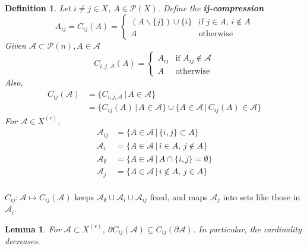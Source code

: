 \documentclass[a4paper]{article}
\newtheorem*{definition}{Definition}
\newtheorem{lemma}[theorem]{Lemma}
\begin{document}
\begin{definition}
	Let $i \neq j \in X$, $A \in \mathcal{P}(X)$. Define the \textbf{ij-compression} $$A_{ij} = C_{ij}(A) = \begin{cases}
	(A\backslash \{j\}) \cup \{i\} & \text{if } j \in A,\, i \not\in A \\
	A & \text{otherwise}
	\end{cases}$$
	Given $\mathcal{A} \subset \mathcal{P}(n), A \in \mathcal{A}$ $$C_{i,j,\mathcal{A}}(A) = \begin{cases}
	A_{ij} & \text{if } A_{ij} \not\in \mathcal{A} \\
	A & \text{otherwise}
	\end{cases}$$
	Also,
	\begin{align*}
	C_{ij}(\mathcal{A}) &= \{C_{i,j,\mathcal{A}} \,|\, A \in \mathcal{A} \} \\
	&= \{C_{ij}(A) \,|\, A \in \mathcal{A}\} \cup \{A \in \mathcal{A} \,|\, C_{ij}(A) \in \mathcal{A}\}
	\end{align*}
	For $\mathcal{A} \in X^{(r)}$,
	\begin{align*}
	\mathcal{A}_{ij} &= \{A \in \mathcal{A} \,|\, \{i,j\} \subset A \} \\
	\mathcal{A}_i &= \{A \in \mathcal{A} \,|\, i \in A,\, j \not\in A \} \\
	\mathcal{A}_\emptyset &= \{A \in \mathcal{A} \,|\, A \cap \{i, j\} = \emptyset \} \\
	\mathcal{A}_j &= \{A \in \mathcal{A} \,|\, i \not\in A,\, j \in A \} \\
	\end{align*}
\end{definition}
$C_{ij}: \mathcal{A} \mapsto C_{ij}(\mathcal{A})$ keeps $\mathcal{A}_\emptyset \cup \mathcal{A}_i \cup \mathcal{A}_{ij}$ fixed, and maps $\mathcal{A}_j$ into sets like those in $\mathcal{A}_i$.

\begin{lemma}
	For $\mathcal{A} \subset X^{(r)}$, $\partial C_{ij}(\mathcal{A}) \subseteq C_{ij}(\partial \mathcal{A})$. In particular, the cardinality decreases.
\end{lemma}
\end{document}
